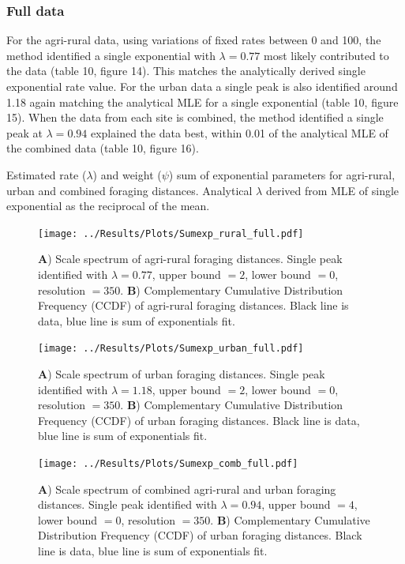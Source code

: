 \documentclass[11pt,usenames,dvipsnames,a4paper]{article}
\begin{document}
\subsubsection{Full data}
\begin{linenumbers}
\hspace{\parindent}
For the agri-rural data, using variations of fixed rates between 0 and 100, the method identified a single exponential with $\lambda = 0.77$ most likely contributed to the data (table 10, figure 14). This matches the analytically derived single exponential rate value. For the urban data a single peak is also identified around 1.18 again matching the analytical MLE for a single exponential (table 10, figure 15). When the data from each site is combined, the method identified a single peak at $\lambda = 0.94$ explained the data best, within 0.01 of the analytical MLE of the combined data (table 10, figure 16). 
\end{linenumbers}

\begin{table}[H]
	\centering
	\caption{Estimated rate ($\lambda$) and weight ($\psi$) sum of exponential parameters for agri-rural, urban and combined foraging distances. Analytical $\lambda$ derived from MLE of single exponential as the reciprocal of the mean.}
	
\end{table}


\begin{figure}[H]
	\centering
	\texttt{[image: ../Results/Plots/Sumexp\_rural\_full.pdf]}
	\caption{\textbf{A}) Scale spectrum of agri-rural foraging distances. Single peak identified with $\lambda = 0.77$, upper bound $= 2$, lower bound $= 0$, resolution $= 350$. \textbf{B}) Complementary Cumulative Distribution Frequency (CCDF) of agri-rural foraging distances. Black line is data, blue line is sum of exponentials fit.}
\end{figure}

\begin{figure}[H]
	\centering
	\texttt{[image: ../Results/Plots/Sumexp\_urban\_full.pdf]}
	\caption{\textbf{A}) Scale spectrum of urban foraging distances. Single peak identified with $\lambda = 1.18$, upper bound $= 2$, lower bound $= 0$, resolution $= 350$. \textbf{B}) Complementary Cumulative Distribution Frequency (CCDF) of urban foraging distances. Black line is data, blue line is sum of exponentials fit.}
\end{figure}

\begin{figure}[H]
	\centering
	\texttt{[image: ../Results/Plots/Sumexp\_comb\_full.pdf]}
	\caption{\textbf{A}) Scale spectrum of combined agri-rural and urban foraging distances. Single peak identified with $\lambda = 0.94$, upper bound $= 4$, lower bound $= 0$, resolution $= 350$. \textbf{B}) Complementary Cumulative Distribution Frequency (CCDF) of urban foraging distances. Black line is data, blue line is sum of exponentials fit.}
\end{figure}
\end{document}
